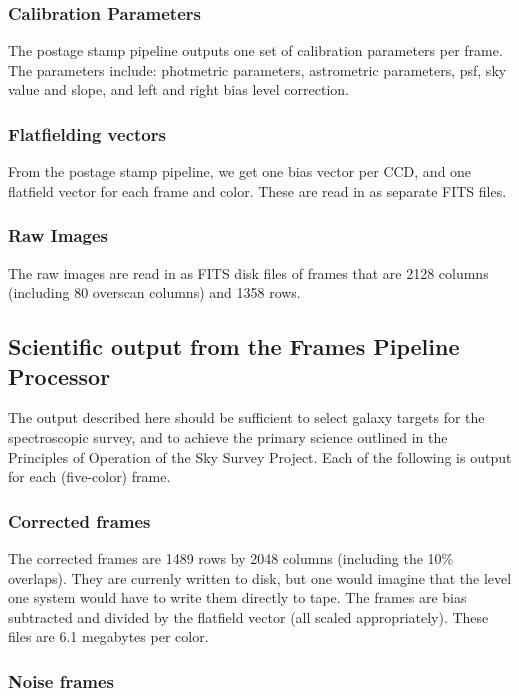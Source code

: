 \subsubsection{Calibration Parameters}

The postage stamp pipeline outputs one set of calibration parameters per
frame.  The parameters include: photmetric parameters, astrometric
parameters, psf, sky value and slope, and left and right bias level correction.

\subsubsection{Flatfielding vectors}

From the postage stamp pipeline, we get one bias vector per CCD, and one
flatfield vector for each frame and color.  These are read in as separate
FITS files.

\subsubsection{Raw Images}

The raw images are read in as FITS disk files of frames that are 2128 columns
(including 80 overscan columns) and 1358 rows.

\subsection{Scientific output from the Frames Pipeline Processor}

The output described here should be
sufficient to select galaxy targets for the spectroscopic survey, and to
achieve the primary science outlined in the Principles of Operation of
the Sky Survey Project.  Each of the following is output for each
(five-color) frame.

\subsubsection{Corrected frames}

	The corrected frames are 1489 rows by 2048 columns (including
the 10\% overlaps).  They are currenly written to disk, but one would imagine
that the level one system would have to write them directly to tape.
The frames are bias subtracted and divided by
the flatfield vector (all scaled appropriately).  These files are 6.1
megabytes per color.

\subsubsection{Noise frames}

